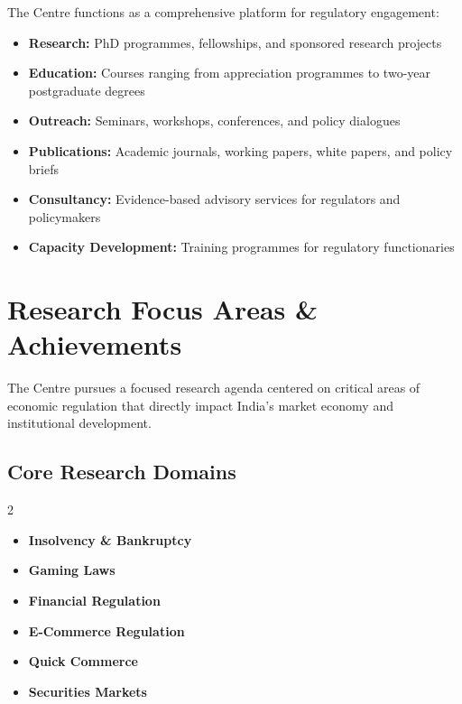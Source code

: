 \documentclass[11pt,a4paper]{article}
\begin{document}
\begin{tcolorbox}[colback=vellum,colframe=ink,arc=2mm,boxrule=1.5pt]
The Centre functions as a comprehensive platform for regulatory engagement:

\begin{itemize}[leftmargin=*,itemsep=0.3cm]
    \item \textbf{Research:} PhD programmes, fellowships, and sponsored research projects
    \item \textbf{Education:} Courses ranging from appreciation programmes to two-year postgraduate degrees
    \item \textbf{Outreach:} Seminars, workshops, conferences, and policy dialogues
    \item \textbf{Publications:} Academic journals, working papers, white papers, and policy briefs
    \item \textbf{Consultancy:} Evidence-based advisory services for regulators and policymakers
    \item \textbf{Capacity Development:} Training programmes for regulatory functionaries
\end{itemize}
\end{tcolorbox}

\clearpage

\section{Research Focus Areas \& Achievements}

The Centre pursues a focused research agenda centered on critical areas of economic regulation that directly impact India's market economy and institutional development.

\subsection*{Core Research Domains}

\begin{multicols}{2}
\begin{itemize}[leftmargin=*,noitemsep]
    \item \textbf{Insolvency \& Bankruptcy}
    \item \textbf{Gaming Laws}
    \item \textbf{Financial Regulation}
    \item \textbf{E-Commerce Regulation}
    \item \textbf{Quick Commerce}
    \item \textbf{Securities Markets}
\end{itemize}
\end{multicols}
\end{document}
